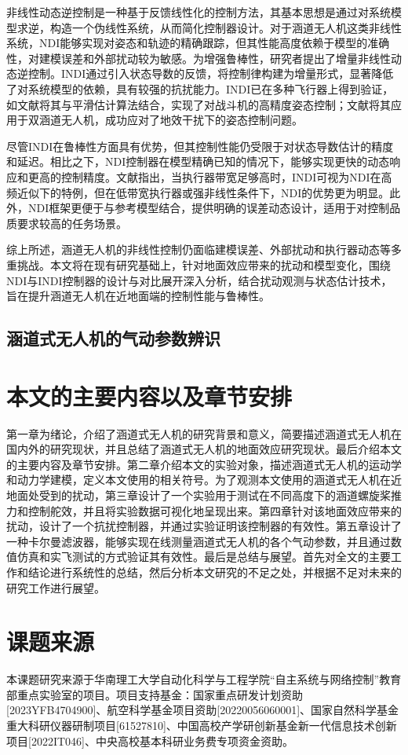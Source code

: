 非线性动态逆控制是一种基于反馈线性化的控制方法，其基本思想是通过对系统模型求逆，构造一个伪线性系统，从而简化控制器设计\cite{zhu1997NDI}。对于涵道无人机这类非线性系统，NDI能够实现对姿态和轨迹的精确跟踪，但其性能高度依赖于模型的准确性，对建模误差和外部扰动较为敏感\cite{zhang2015NDI}。为增强鲁棒性，研究者提出了增量非线性动态逆控制。INDI通过引入状态导数的反馈，将控制律构建为增量形式，显著降低了对系统模型的依赖，具有较强的抗扰能力\cite{wang2019flexible, smeur2016adaptive}。INDI已在多种飞行器上得到验证，如文献\cite{ludena2020flight}将其与平滑估计算法结合，实现了对战斗机的高精度姿态控制；文献\cite{Cheng2024INDI}将其应用于双涵道无人机，成功应对了地效干扰下的姿态控制问题。

尽管INDI在鲁棒性方面具有优势，但其控制性能仍受限于对状态导数估计的精度和延迟\cite{SteffensenINDI}。相比之下，NDI控制器在模型精确已知的情况下，能够实现更快的动态响应和更高的控制精度。文献指出，当执行器带宽足够高时，INDI可视为NDI在高频近似下的特例，但在低带宽执行器或强非线性条件下，NDI的优势更为明显\cite{SteffensenINDI}。此外，NDI框架更便于与参考模型结合，提供明确的误差动态设计，适用于对控制品质要求较高的任务场景。

综上所述，涵道无人机的非线性控制仍面临建模误差、外部扰动和执行器动态等多重挑战。本文将在现有研究基础上，针对地面效应带来的扰动和模型变化，围绕NDI与INDI控制器的设计与对比展开深入分析，结合扰动观测与状态估计技术，旨在提升涵道无人机在近地面端的控制性能与鲁棒性。


\subsection{涵道式无人机的气动参数辨识}


\section{本文的主要内容以及章节安排}
第一章为绪论，介绍了涵道式无人机的研究背景和意义，简要描述涵道式无人机在国内外的研究现状，并且总结了涵道式无人机的地面效应研究现状。最后介绍本文的主要内容及章节安排。第二章介绍本文的实验对象，描述涵道式无人机的运动学和动力学建模，定义本文使用的相关符号。为了观测本文使用的涵道式无人机在近地面处受到的扰动，第三章设计了一个实验用于测试在不同高度下的涵道螺旋桨推力和控制舵效，并且将实验数据可视化地呈现出来。第四章针对该地面效应带来的扰动，设计了一个抗扰控制器，并通过实验证明该控制器的有效性。第五章设计了一种卡尔曼滤波器，能够实现在线测量涵道式无人机的各个气动参数，并且通过数值仿真和实飞测试的方式验证其有效性。最后是总结与展望。首先对全文的主要工作和结论进行系统性的总结，然后分析本文研究的不足之处，并根据不足对未来的研究工作进行展望。

\section{课题来源}
本课题研究来源于华南理工大学自动化科学与工程学院“自主系统与网络控制”教育部重点实验室的项目。项目支持基金：国家重点研发计划资助[2023YFB4704900]、航空科学基金项目资助[20220056060001]、国家自然科学基金重大科研仪器研制项目[61527810]、中国高校产学研创新基金新一代信息技术创新项目[2022IT046]、中央高校基本科研业务费专项资金资助。
